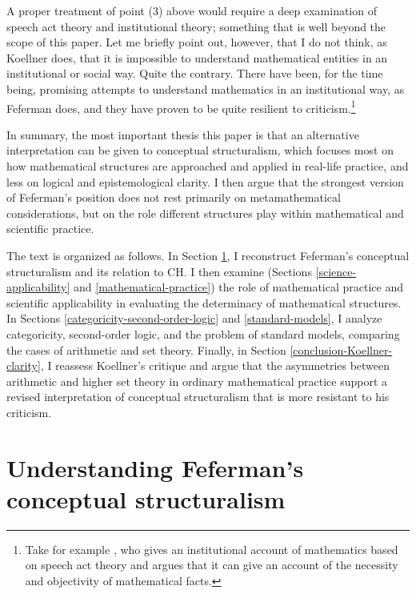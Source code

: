 \documentclass[11pt,a4paper]{article}
\theoremstyle{plain}
\begin{document}
A proper treatment of point (3) above would require a deep examination of speech act theory and institutional theory; something that is well beyond the scope of this paper. Let me briefly point out, however, that I do not think, as Koellner does, that it is impossible to understand mathematical entities in an institutional or social way. Quite the contrary. There have been, for the time being, promising attempts to understand mathematics in an institutional way, as Feferman does, and they have proven to be quite resilient to criticism.\footnote{Take for example \textcite{Cole2013}, who gives an institutional account of mathematics based on speech act theory and argues that it can give an account of the necessity and objectivity of mathematical facts.}

In summary, the most important thesis this paper is that an alternative interpretation can be given to conceptual structuralism, which focuses most on how mathematical structures are approached and applied in real-life practice, and less on logical and epistemological clarity. I then argue that the strongest version of Feferman's position does not rest primarily on metamathematical considerations, but on the role different structures play within mathematical and scientific practice.

The text is organized as follows. In Section \ref{conceptual-structuralism-intro}, I reconstruct Feferman’s conceptual structuralism and its relation to CH. I then examine (Sections \ref{science-applicability} and \ref{mathematical-practice}) the role of mathematical practice and scientific applicability in evaluating the determinacy of mathematical structures. In Sections \ref{categoricity-second-order-logic} and \ref{standard-models}, I analyze categoricity, second-order logic, and the problem of standard models, comparing the cases of arithmetic and set theory. Finally, in Section \ref{conclusion-Koellner-clarity}, I reassess Koellner’s critique and argue that the asymmetries between arithmetic and higher set theory in ordinary mathematical practice support a revised interpretation of conceptual structuralism that is more resistant to his criticism.

\section{Understanding Feferman's conceptual structuralism}
\label{conceptual-structuralism-intro}
\end{document}
